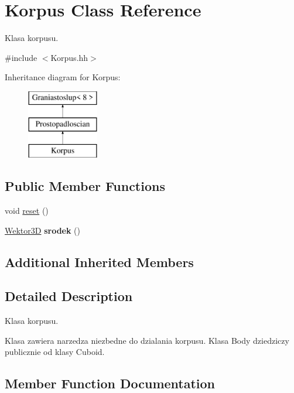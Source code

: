 \hypertarget{class_korpus}{}\section{Korpus Class Reference}
\label{class_korpus}


Klasa korpusu.  




{\ttfamily \#include $<$Korpus.\+hh$>$}

Inheritance diagram for Korpus\+:\begin{figure}[H]
\begin{center}
\leavevmode
\includegraphics[height=3.000000cm]{class_korpus}
\end{center}
\end{figure}
\subsection*{Public Member Functions}
\begin{DoxyCompactItemize}
\item 
void \mbox{\hyperlink{class_korpus_ad4b0d050454bb4ff45dd30ce00b1e5fa}{reset}} ()
\item 
\mbox{\label{class_korpus_ab8b53770f5433818c85a574a435dd6e6}} 
\mbox{\hyperlink{class_wektor}{Wektor3D}} {\bfseries srodek} ()
\end{DoxyCompactItemize}
\subsection*{Additional Inherited Members}


\subsection{Detailed Description}
Klasa korpusu. 

Klasa zawiera narzedza niezbedne do dzialania korpusu. Klasa Body dziedziczy publicznie od klasy Cuboid. 

\subsection{Member Function Documentation}
\mbox{\label{class_korpus_ad4b0d050454bb4ff45dd30ce00b1e5fa}} 
